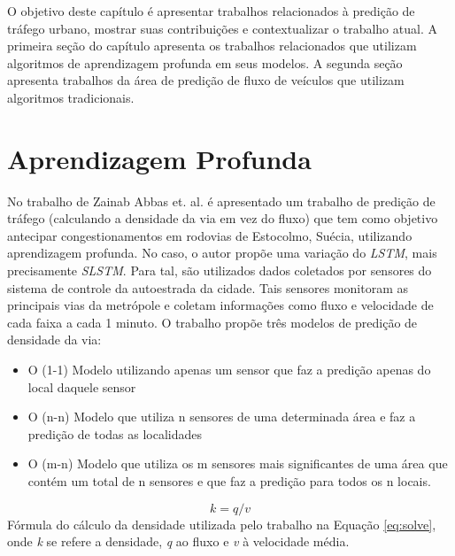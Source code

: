 
\label{chapter:trabalhos_relacionados}

O objetivo deste capítulo é apresentar trabalhos relacionados à predição de tráfego urbano, mostrar suas contribuições e contextualizar o trabalho atual. A primeira seção do capítulo apresenta os trabalhos relacionados que utilizam algoritmos de aprendizagem profunda em seus modelos. A segunda seção apresenta trabalhos da área de predição de fluxo de veículos que utilizam algoritmos tradicionais.

\section{Aprendizagem Profunda}

No trabalho de Zainab Abbas et. al. \cite{Zainab_2018} é apresentado um trabalho de predição de tráfego (calculando a densidade da via em vez do fluxo) que tem como objetivo antecipar congestionamentos em rodovias de Estocolmo, Suécia, utilizando aprendizagem profunda. No caso, o autor propõe uma variação do \textit{\acrshort{LSTM}}, mais precisamente \textit{\acrfull{SLSTM}}. Para tal, são utilizados dados coletados por sensores do sistema de controle da autoestrada da cidade. Tais sensores monitoram as principais vias da metrópole e coletam informações como fluxo e velocidade de cada faixa a cada 1 minuto. O trabalho propõe três modelos de predição de densidade da via:

\begin{itemize}
    \item O (1-1) Modelo utilizando apenas um sensor que faz a predição apenas do local daquele sensor
    \item O (n-n) Modelo que utiliza n sensores de uma determinada área e faz a predição de todas as localidades
    \item O (m-n) Modelo que utiliza os m sensores mais significantes de uma área que contém um total de n sensores e que faz a predição para todos os n locais.
\end{itemize}

\begin{equation}\label{eq:solve}
k = q / v
\end{equation}
Fórmula do cálculo da densidade utilizada pelo trabalho na Equação \ref{eq:solve}, onde \textit{k} se refere a densidade, \textit{q} ao fluxo e \textit{v} à velocidade média.

